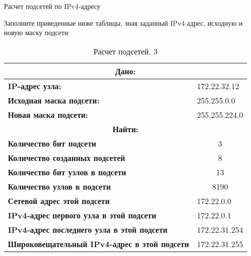 \documentclass[a4paper,14pt]{extarticle}
\begin{document}
\begin{mypart}{Расчет подсетей по IPv4-адресу}
\begin{step}{Заполните приведенные ниже таблицы, зная заданный IPv4-адрес, исходную и
			новую маску подсети}
\begin{table}[h!]
		\centering
		\caption{Расчет подсетей. 3}
	\begin{tabular}{|l|l|}
		\hline
			\multicolumn{2}{|c|}{\textbf{Дано:}}  \\ \hline
		\textbf{IP-адрес узла:} & 172.22.32.12 \\ \hline
		\textbf{Исходная маска подсети:} & 255.255.0.0 \\ \hline
		\textbf{Новая маска подсети:} & 255.255.224.0 \\ \hline
			\multicolumn{2}{|c|}{\textbf{Найти:}}  \\ \hline
		\textbf{Количество бит подсети} & \multicolumn{1}{c|}{3} \\ \hline
		\textbf{Количество созданных подсетей} & \multicolumn{1}{c|}{8} \\ \hline
		\textbf{Количество бит узлов в подсети} & \multicolumn{1}{c|}{13} \\ \hline
		\textbf{Количество узлов в подсети} & \multicolumn{1}{c|}{8190} \\ \hline
		\textbf{Сетевой адрес этой подсети} & 172.22.0.0 \\ \hline
		\textbf{IPv4-адрес первого узла в этой подсети} & 172.22.0.1 \\ \hline
		\textbf{IPv4-адрес последнего узла в этой подсети} & 172.22.31.254 \\ \hline
		\textbf{Широковещательный IPv4-адрес в этой подсети} & 172.22.31.255 \\ \hline
	\end{tabular}
	\label{}
\end{table}



\end{step}
\end{mypart}
\end{document}
